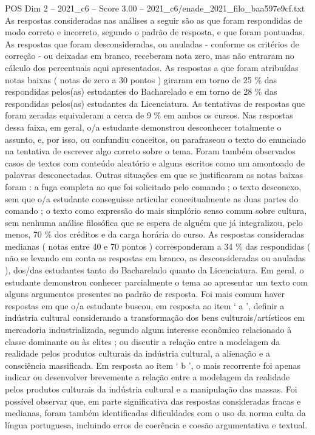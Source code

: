 \begin{textsample}{POS Dim 2 – 2021\_c6 – Score 3.00 – 2021\_c6/enade\_2021\_filo\_baa597e9cf.txt}
As respostas consideradas nas análises a seguir são as que foram respondidas de modo correto e incorreto, segundo o padrão de resposta, e que foram pontuadas.
As respostas que foram desconsideradas, ou anuladas - conforme os critérios de correção - ou deixadas em branco, receberam nota zero, mas não entraram no cálculo dos percentuais aqui apresentados.
As respostas a que foram atribuídas notas baixas ( notas de zero a 30 pontos ) giraram em torno de 25 \% das respondidas pelos(as) estudantes do Bacharelado e em torno de 28 \% das respondidas pelos(as) estudantes da Licenciatura.
As tentativas de respostas que foram zeradas equivaleram a cerca de 9 \% em ambos os cursos.
Nas respostas dessa faixa, em geral, o/a estudante demonstrou desconhecer totalmente o assunto, e, por isso, ou confundiu conceitos, ou parafraseou o texto do enunciado na tentativa de escrever algo correto sobre o tema.
Foram também observados casos de textos com conteúdo aleatório e alguns escritos como um amontoado de palavras desconectadas.
Outras situações em que se justificaram as notas baixas foram : a fuga completa ao que foi solicitado pelo comando ; o texto desconexo, sem que o/a estudante conseguisse articular conceitualmente as duas partes do comando ; o texto como expressão do mais simplório senso comum sobre cultura, sem nenhuma análise filosófica que se espera de alguém que já integralizou, pelo menos, 70 \% dos créditos e da carga horária do curso.
As respostas consideradas medianas ( notas entre 40 e 70 pontos ) corresponderam a 34 \% das respondidas ( não se levando em conta as respostas em branco, as desconsideradas ou anuladas ), dos/das estudantes tanto do Bacharelado quanto da Licenciatura.
Em geral, o estudante demonstrou conhecer parcialmente o tema ao apresentar um texto com alguns argumentos presentes no padrão de resposta.
Foi mais comum haver respostas em que o/a estudante buscou, em resposta ao item ‘ a ’, definir a indústria cultural considerando a transformação dos bens culturais/artísticos em mercadoria industrializada, segundo algum interesse econômico relacionado à classe dominante ou às elites ; ou discutir a relação entre a modelagem da realidade pelos produtos culturais da indústria cultural, a alienação e a consciência massificada.
Em resposta ao item ‘ b ’, o mais recorrente foi apenas indicar ou desenvolver brevemente a relação entre a modelagem da realidade pelos produtos culturais da indústria cultural e a manipulação das massas.
Foi possível observar que, em parte significativa das respostas consideradas fracas e medianas, foram também identificadas dificuldades com o uso da norma culta da língua portuguesa, incluindo erros de coerência e coesão argumentativa e textual.

\end{textsample}
